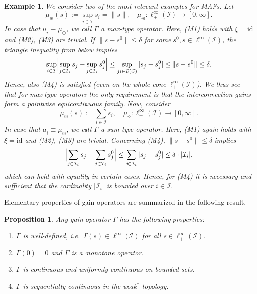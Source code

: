 \documentclass[10pt, oneside, a4paper]{article}
\newcommand{\id}{\mathrm{id}}
\newcommand{\GC}{\mathcal{G}}
\newcommand{\IC}{\mathcal{I}}
\newtheorem{proposition}{Proposition}[section]
\newtheorem{example}{Example}[section]
\begin{document}
\begin{example}
We consider two of the most relevant examples for MAFs. Let%
\begin{equation*}
  \mu_{\oplus}(s) := \sup_{i\in\IC}s_i = \|s\|,\quad \mu_{\oplus}:\ell^{\infty}_+(\IC) \rightarrow [0,\infty].%
\end{equation*}
In case that $\mu_i \equiv \mu_{\oplus}$, we call $\Gamma$ a \emph{max-type operator}. Here, (M1) holds with $\xi = \id$ and (M2), (M3) are trivial. If $\|s - s^0\| \leq \delta$ for some $s^0,s \in \ell^{\infty}_+(\IC)$, the triangle inequality from below implies%
\begin{equation*}
  \sup_{i \in \IC} \Bigl|\sup_{j \in \IC_i}s_j - \sup_{j \in \IC_i}s^0_j\Bigr| \leq \sup_{ji \in E(\GC)} |s_j - s^0_j| \leq \|s - s^0\| \leq \delta.%
\end{equation*}
Hence, also (M4) is satisfied (even on the whole cone $\ell^{\infty}_+(\IC)$). We thus see that for max-type operators the only requirement is that the interconnection gains form a pointwise equicontinuous family. Now, consider%
\begin{equation*}
  \mu_{\otimes}(s) := \sum_{i\in\IC}s_i,\quad \mu_{\otimes}:\ell^{\infty}_+(\IC) \rightarrow [0,\infty].%
\end{equation*}
In case that $\mu_i \equiv \mu_{\otimes}$, we call $\Gamma$ a \emph{sum-type operator}. Here, (M1) again holds with $\xi = \id$ and (M2), (M3) are trivial. Concerning (M4), $\|s - s^0\| \leq \delta$ implies%
\begin{equation*}
  \Bigl|\sum_{j \in \IC_i}s_j - \sum_{j \in \IC_i}s^0_j\Bigr| \leq \sum_{j \in \IC_i} |s_j - s^0_j| \leq \delta \cdot |\IC_i|,%
\end{equation*}
which can hold with equality in certain cases. Hence, for (M4) it is necessary and sufficient that the cardinality $|\IC_i|$ is bounded over $i \in \IC$.
\end{example}

Elementary properties of gain operators are summarized in the following result.%

\begin{proposition}\label{prop_gainop_props}
Any gain operator $\Gamma$ has the following properties:%
\begin{enumerate}
\item[(a)] $\Gamma$ is well-defined, i.e.~$\Gamma(s) \in \ell^{\infty}_+(\IC)$ for all $s \in \ell^{\infty}_+(\IC)$.%
\item[(b)] $\Gamma(0) = 0$ and $\Gamma$ is a monotone operator.
\item[(c)] $\Gamma$ is continuous and uniformly continuous on bounded sets.%
\item[(d)] $\Gamma$ is sequentially continuous in the weak$^*$-topology.%
\end{enumerate}
\end{proposition}
\end{document}
